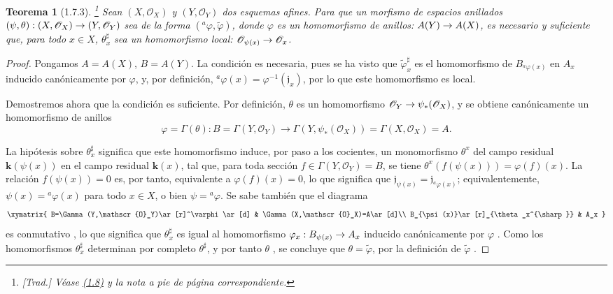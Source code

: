 \documentclass[oneside]{amsart}
\theoremstyle{ega-env-style}
\theoremstyle{ega-thm-env-style}
\newtheorem*{theorem}{Teorema}
\theoremstyle{ega-defn-env-style}
\renewcommand{\to}{\mathchoice{\longrightarrow}{\rightarrow}{\rightarrow}{\rightarrow}}
\newcommand{\oldpage}[2][]{{\marginnote{\normalfont{\textbf{#1}~|~#2}}}\ignorespaces}
\let\EGAOriginalLabel\label
\renewcommand{\label}[1]{\phantomsection\EGAOriginalLabel{#1}}
\begin{document}
\begin{theorem}[1.7.3]
\label{I.1.7.3}
\footnote{\emph{[Trad.] Véase \hyperref[subsection:I.1.8]{(1.8)} y la nota a pie de página correspondiente.}}
Sean $(X,\mathscr{O}_X)$ y $(Y,\mathscr{O}_Y)$ dos esquemas afines.
Para que un morfismo de espacios anillados $(\psi,\theta):(X,\mathscr{O}_X)\to(Y,\mathscr{O}_Y)$ sea de la forma $({}^a\varphi,\widetilde\varphi)$, donde $\varphi$ es un homomorfismo de anillos: $A(Y)\to A(X)$, es necesario y suficiente que, para todo $x\in X$, $\theta_x^{\sharp}$ sea un homomorfismo \textup{local}: $\mathscr{O}_{\psi(x)}\to\mathscr{O}_x$.
\end{theorem}

\begin{proof}
\oldpage[I]{97}
Pongamos $A=A(X)$, $B=A(Y)$.
La condición es necesaria, pues se ha visto  que $\widetilde\varphi_x^{\sharp}$ es el homomorfismo de $B_{{}^a\varphi(x)}$ en $A_x$ inducido canónicamente por $\varphi$, y, por definición, ${}^a\varphi(x)=\varphi^{-1}(\mathfrak{j}_x)$, por lo que este homomorfismo es local.

Demostremos ahora que la condición es suficiente.
Por definición, $\theta$ es un homomorfismo $\mathscr{O}_Y\to\psi_*(\mathscr{O}_X)$, y se obtiene canónicamente un homomorfismo de anillos
\[
  \varphi=\Gamma(\theta):
  B=\Gamma(Y,\mathscr{O}_Y)
  \longrightarrow
  \Gamma(Y,\psi_*(\mathscr{O}_X))=\Gamma(X,\mathscr{O}_X)=A.
\]

La hipótesis sobre $\theta_x^{\sharp}$ significa que este homomorfismo induce, por paso a los cocientes, un monomorfismo $\theta^x$ del campo residual $\boldsymbol{k}(\psi(x))$ en el campo residual $\boldsymbol{k}(x)$, tal que, para toda sección $f\in\Gamma(Y,\mathscr{O}_Y)=B$, se tiene $\theta^x(f(\psi(x)))=\varphi(f)(x)$.
La relación $f(\psi(x))=0$ es, por tanto, equivalente a $\varphi(f)(x)=0$, lo que significa que $\mathfrak{j}_{\psi(x)}=\mathfrak{j}_{{}^a\varphi(x)}$; equivalentemente, $\psi(x)={}^a\varphi(x)$ para todo $x\in X$, o bien $\psi={}^a\varphi$.
Se sabe también que el diagrama
\label{I.1.7.3.diagram-fr}
\[
  \xymatrix{
    B=\Gamma(Y,\mathscr{O}_Y)\ar[r]^\varphi\ar[d] &
    \Gamma(X,\mathscr{O}_X)=A\ar[d]\\
    B_{\psi(x)}\ar[r]_{\theta_x^{\sharp}} & A_x
  }
\]
es conmutativo , lo que significa que $\theta_x^{\sharp}$ es igual al homomorfismo $\varphi_x:B_{\psi(x)}\to A_x$ inducido canónicamente por $\varphi$ .
Como los homomorfismos $\theta_x^{\sharp}$ determinan por completo $\theta^{\sharp}$, y por tanto $\theta$ , se concluye que $\theta=\widetilde\varphi$, por la definición de $\widetilde\varphi$ .
\end{proof}
\end{document}
